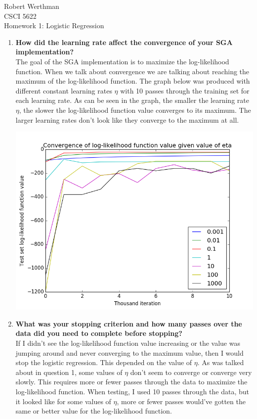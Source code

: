 \documentclass[8pt]{article}
\begin{document}
\noindent
Robert Werthman\\
CSCI 5622\\
Homework 1: Logistic Regression\\

\begin{enumerate}
\item \textbf{How did the learning rate affect the convergence of your SGA implementation?}\\
The goal of the SGA implementation is to maximize the log-likelihood function.  When we talk about convergence we are talking about reaching the maximum of the log-likelihood function.  The graph below was produced with different constant learning rates $\eta$ with 10 passes through the training set for each learning rate.  As can be seen in the graph, the smaller the learning rate $\eta$, the slower the log-likelihood function value converges to its maximum.  The larger learning rates don't look like they converge to the maximum at all.\\
\begin{center}
\includegraphics[scale=.4]{q1.png}
\end{center}
\item \textbf{What was your stopping criterion and how many passes over the data did you need to complete before stopping?}\\
If I didn't see the log-likelihood function value increasing or the value was jumping around and never converging to the maximum value, then I would stop the logistic regression.  This depended on the value of $\eta$.  As was talked about in question 1, some values of $\eta$ don't seem to converge or converge very slowly.  This requires more or fewer passes through the data to maximize the log-likelihood function.  When testing, I used 10 passes through the data, but it looked like for some values of $\eta$, more or fewer passes would've gotten the same or better value for the log-likelihood function.  


\end{enumerate}
\end{document}
